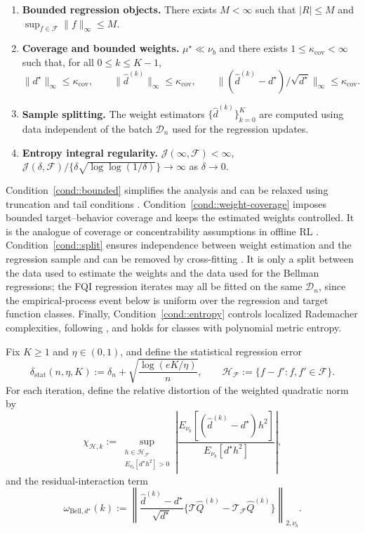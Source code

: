 \documentclass{article}
\theoremstyle{plain}
\theoremstyle{definition}
\theoremstyle{remark}
\begin{document}
\begin{enumerate}[label=\textbf{C\arabic*)}, ref={C\arabic*}, leftmargin=1.5em, resume=cond]
\item \label{cond::bounded}
\textbf{Bounded regression objects.}
There exists \(M<\infty\) such that \(|R|\le M\) and
\(\sup_{f\in\mathcal F}\|f\|_\infty\le M\).

\item \label{cond::weight-coverage}
\textbf{Coverage and bounded weights.}
\(\mu^\star\ll\nu_b\) and there exists
\(1\le\kappa_{\mathrm{cov}}<\infty\) such that, for all \(0\le k\le K-1\),
\[
\|d^\star\|_\infty\le \kappa_{\mathrm{cov}},
\qquad
\|\widehat d^{(k)}\|_\infty\le \kappa_{\mathrm{cov}},
\qquad
\|(\widehat d^{(k)}-d^\star)/\sqrt{d^\star}\|_\infty
\le \kappa_{\mathrm{cov}} .
\]

\item \label{cond::split}
\textbf{Sample splitting.}
The weight estimators \(\{\widehat d^{(k)}\}_{k=0}^K\) are computed
using data independent of the batch \(\mathcal{D}_n\) used for the regression
updates.

\item \label{cond::entropy}
\textbf{Entropy integral regularity.}
 \(\mathcal J(\infty, \mathcal F) < \infty\),
\(\mathcal J(\delta,\mathcal F)/
\{\delta \sqrt{\log\!\log(1/\delta)}\}\to\infty\) as \(\delta\to 0\).
\end{enumerate}
Condition~\ref{cond::bounded} simplifies the analysis and can be relaxed using
truncation and tail conditions \citep{wainwright2019high}.
Condition~\ref{cond::weight-coverage} imposes bounded target--behavior coverage
and keeps the estimated weights controlled. It is the analogue of coverage or
concentrability assumptions in offline RL
\citep{xie2022role,uehara2020minimax}.
Condition~\ref{cond::split} ensures independence between weight estimation and
the regression sample and can be removed by cross-fitting
\citep{nie2021quasi,foster2023orthogonal,van2026researcher}. It is only a
split between the data used to estimate the weights and the data used for the
Bellman regressions; the FQI regression iterates may all be fitted on the same
\(\mathcal D_n\), since the empirical-process event below is uniform over the
regression and target function classes.
Finally, Condition~\ref{cond::entropy} controls localized Rademacher
complexities, following \citet{munos2008finite}, and holds for classes with
polynomial metric entropy.


Fix \(K\ge1\) and \(\eta\in(0,1)\), and define the statistical regression error 
\[
\delta_{\mathrm{stat}}(n,\eta,K)
:=
\delta_n+\sqrt{\frac{\log(eK/\eta)}{n}},
\qquad
\mathcal H_{\mathcal F}:=\{f-f':f,f'\in\mathcal F\}.
\]
For each iteration, define the relative distortion of the weighted
quadratic norm by
\[
\chi_{\mathcal H,k}
:=
\sup_{\substack{h\in\mathcal H_{\mathcal F}\\
E_{\nu_b}[d^\star h^2]>0}}
\left|
\frac{E_{\nu_b}[(\widehat d^{(k)}-d^\star)h^2]}
     {E_{\nu_b}[d^\star h^2]}
\right|,
\]
and the residual-interaction term
\[
\omega_{\mathrm{Bell},d^\star}(k)
:=
\left\|
\frac{\widehat d^{(k)}-d^\star}{\sqrt{d^\star}}
\{\mathcal T\widehat Q^{(k)}
-\mathcal T_{\mathcal F}\widehat Q^{(k)}\}
\right\|_{2,\nu_b}.
\]
\end{document}
